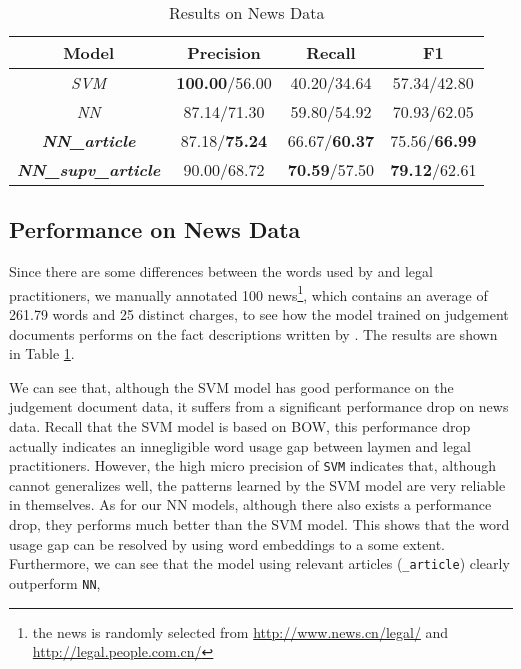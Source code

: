 \begin{table}
\centering
\small{
\begin{tabular}{|c|c|c|c|}
\hline
\textbf{Model}												& \textbf{Precision} 				& \textbf{Recall} 				& \textbf{F1} 	\\
\hline
\textit{SVM} 													& \textbf{100.00}/56.00			& 40.20/34.64  						& 57.34/42.80 				 	\\
\hline
\textit{NN}														& 87.14/71.30								& 59.80/54.92 						& 70.93/62.05					\\
\hline
\textbf{\textit{NN\_article}}					& 87.18/\textbf{75.24}			& 66.67/\textbf{60.37} 		& 75.56/\textbf{66.99}					\\
\hline
\textbf{\textit{NN\_supv\_article}} 	& 90.00/68.72 							& \textbf{70.59}/57.50 		& \textbf{79.12}/62.61 		 	\\
\hline
\end{tabular}
}
\caption{Results on News Data}
\label{tabble_news_results}
\end{table}

\subsection{Performance on News Data}
Since there are some differences between the words used by  and legal practitioners, 
we manually annotated 100 news\footnote{the news is randomly selected from \url{http://www.news.cn/legal/} and \url{http://legal.people.com.cn/}}, 
which contains an average of 261.79 words and 25 distinct charges, to see how the model trained on judgement documents performs on the fact descriptions written by . The results are shown in Table \ref{tabble_news_results}.

We can see that, although the SVM model has good performance on the judgement document data, it suffers from a significant performance drop on news data.
Recall that the SVM model is based on BOW, this performance drop actually indicates an innegligible word usage gap between laymen and legal practitioners. 
However, the high micro precision of \texttt{SVM} indicates that, although cannot generalizes well, the patterns learned by the SVM model are very reliable in themselves.
As for our NN models, although there also exists a performance drop, they performs much better than the SVM model. This shows that the word usage gap can be resolved by using word embeddings to a some extent. Furthermore, we can see that the model using relevant articles (\texttt{\_article}) clearly outperform \texttt{NN}, 

